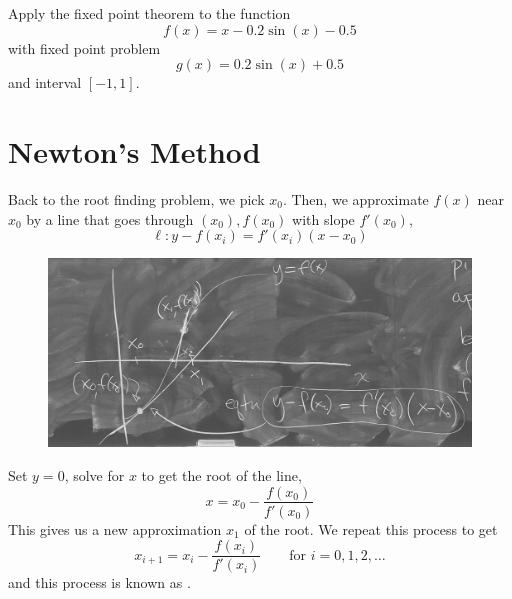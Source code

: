\begin{example}[Exercise]
    Apply the fixed point theorem to the function \[
        f(x) = x -0.2 \sin(x) - 0.5
    \] with fixed point problem \[
        g(x) = 0.2 \sin(x) + 0.5
    \] and interval \( [-1, 1] \).
\end{example}

\section{Newton's Method}

Back to the root finding problem, we pick \( x_0 \). Then, we approximate \( f(x) \) near \( x_0 \) by a line that goes through \( (x_0), f(x_0) \) with slope \( f'(x_0) \), \[
    \ell: y - f(x_i) = f'(x_i) (x - x_0)
\]

\begin{figure}[H]
    \centering
    \includegraphics[width=0.67\linewidth]{figures/newtons_method.jpeg}
\end{figure}

Set \( y = 0 \), solve for \( x \) to get the root of the line, \[
    x = x_0 - \frac{f(x_0)}{f'(x_0)}
\]
This gives us a new approximation \( x_1 \) of the root. We repeat this process to get \[
    x_{i+1} = x_i - \frac{f(x_i)}{f'(x_i)} \qquad \text{for } i = 0, 1, 2, \dots
\] and this process is known as .

